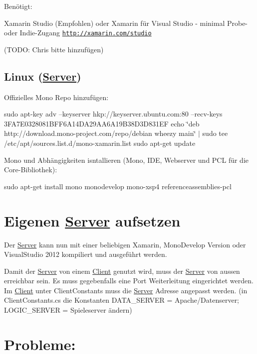 Benötigt\-:
\begin{DoxyItemize}
\item Xamarin Studio (Empfohlen) oder Xamarin für Visual Studio -\/ minimal Probe-\/ oder Indie-\/\-Zugang \href{http://xamarin.com/studio}{\tt http\-://xamarin.\-com/studio}
\end{DoxyItemize}

(T\-O\-D\-O\-: Chris bitte hinzufügen)

\subsection*{Linux (\hyperlink{namespaceServer}{Server})}

Offizielles Mono Repo hinzufügen\-:

sudo apt-\/key adv --keyserver hkp\-://keyserver.ubuntu.\-com\-:80 --recv-\/keys 3\-F\-A7\-E0328081\-B\-F\-F6\-A14\-D\-A29\-A\-A6\-A19\-B38\-D3\-D831\-E\-F echo \char`\"{}deb http\-://download.\-mono-\/project.\-com/repo/debian wheezy main\char`\"{} $\vert$ sudo tee /etc/apt/sources.list.\-d/mono-\/xamarin.list sudo apt-\/get update

Mono und Abhängigkeiten isntallieren (Mono, I\-D\-E, Webserver und P\-C\-L für die Core-\/\-Bibliothek)\-:

sudo apt-\/get install mono monodevelop mono-\/xsp4 referenceassemblies-\/pcl

\section*{Eigenen \hyperlink{namespaceServer}{Server} aufsetzen}

Der \hyperlink{namespaceServer}{Server} kann nun mit einer beliebigen Xamarin, Mono\-Develop Version oder Visual\-Studio 2012 kompiliert und ausgeführt werden.

Damit der \hyperlink{namespaceServer}{Server} von einem \hyperlink{namespaceClient}{Client} genutzt wird, muss der \hyperlink{namespaceServer}{Server} von aussen erreichbar sein. Es muss gegebenfalls eine Port Weiterleitung eingerichtet werden. Im \hyperlink{namespaceClient}{Client} unter Client\-Constants muss die \hyperlink{namespaceServer}{Server} Adresse angepasst werden. (in Client\-Constants.\-cs die Konstanten D\-A\-T\-A\-\_\-\-S\-E\-R\-V\-E\-R = Apache/\-Datenserver; L\-O\-G\-I\-C\-\_\-\-S\-E\-R\-V\-E\-R = Spieleserver ändern)

\section*{Probleme\-:}


